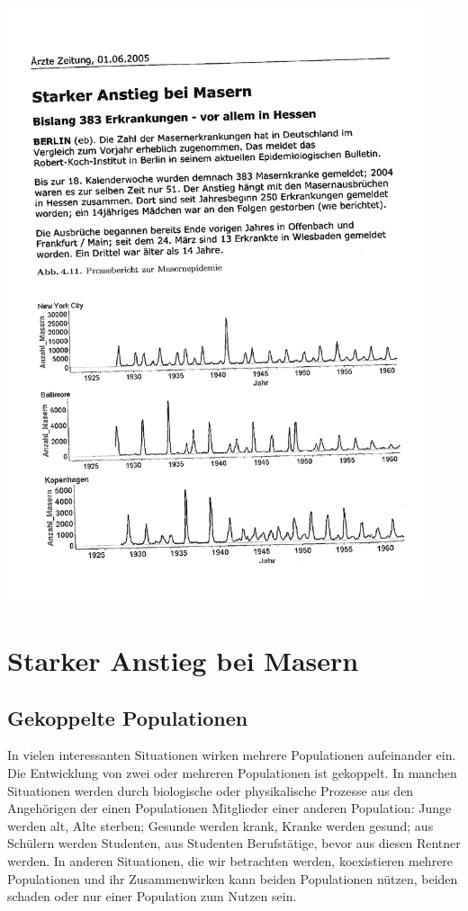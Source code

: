 \documentclass[%
<<<<<<< Updated upstream
11pt,%
twoside,%
titlepage,%
german,%
headsepline%
]{scrartcl}
\begin{document}
\includegraphics[width=0.93\textwidth,page=1,angle=-1.6]{pictures/starkeranstiegzeitung.pdf}

\pagebreak

\section{Starker Anstieg bei Masern}
\subsection{Gekoppelte Populationen}
In
vielen interessanten Situationen wirken mehrere Populationen aufeinander ein. Die
Entwicklung von zwei oder mehreren Populationen ist gekoppelt. In manchen Situationen werden durch biologische oder physikalische Prozesse aus den Angehörigen der einen Populationen Mitglieder einer anderen Population: Junge werden alt, Alte sterben; Gesunde werden krank, Kranke werden gesund; aus Schülern werden Studenten, aus Studenten Berufstätige, bevor aus diesen Rentner werden. In anderen Situationen, die wir betrachten werden, koexistieren mehrere Populationen und ihr Zusammenwirken kann beiden Populationen nützen, beiden schaden oder nur einer Population zum Nutzen sein.
\end{document}
